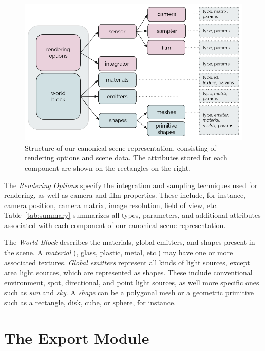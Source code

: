 \begin{figure}[h]
  \includegraphics[width=\textwidth,height=\textheight,keepaspectratio]{images/4_system_architecture/canonicalrep.png}
  \caption{Structure of our canonical scene representation, consisting of rendering options and scene data. The attributes stored for each component are shown on the rectangles on the right.}
  \label{fig:canonicalrep}
\end{figure}

The \textit{Rendering Options} specify the integration and sampling techniques used for rendering, as well as camera and film properties. These include, for instance, camera position, camera matrix, image resolution, field of view, etc. Table~\ref{tab:summary} summarizes all types, parameters, and additional attributes associated with each component of our canonical scene representation. 

The \textit{World Block} describes the materials, global emitters, and shapes present in the scene. A {\it material} (\eg, glass, plastic, metal, etc.) may have one or more associated textures. {\it Global emitters} represent all kinds of light sources, except area light sources, which are represented as shapes. These include conventional environment, spot, directional, and point light sources, as well more specific ones such as {\it sun} and {\it sky}. A {\it shape} can be a polygonal mesh or a geometric primitive such as a rectangle, disk, cube, or sphere, for instance. 



\section{The Export Module}

